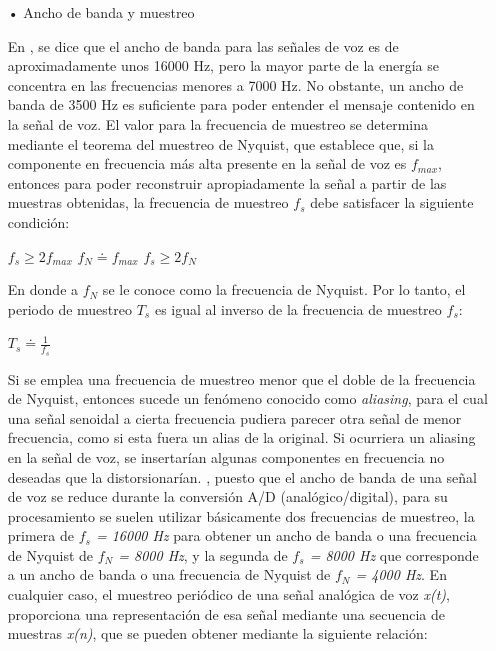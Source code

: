 \begin{enumerate}
\begin{enumerate}
\item[•]Ancho de banda y muestreo
\par
En \cite{claudio}, se dice que el ancho de banda para las señales de voz es de aproximadamente unos 16000 Hz, pero la mayor parte de la energía se concentra en las frecuencias menores a 7000 Hz. No obstante, un ancho de banda de 3500 Hz es suficiente para poder entender el mensaje contenido en la señal de voz.
\vskip 0.5cm
El valor para la frecuencia de muestreo se determina mediante el teorema del muestreo de Nyquist, que establece que, si la componente en frecuencia más alta presente en la señal de voz es \textit{$f_{max}$}, entonces para poder reconstruir apropiadamente la señal a partir de las muestras obtenidas, la frecuencia de muestreo \textit{$f_{s}$} debe satisfacer la siguiente condición:
\begin{center}
$f_{s} \geq 2f_{max}$ \hspace{1cm} $f_{N} \doteq f_{max}$ \hspace{1cm} $f_{s} \geq 2f_{N}$
\end{center}
En donde a $f_{N}$ se le conoce como la frecuencia de Nyquist. Por lo tanto, el periodo de muestreo $T_{s}$ es igual al inverso de la frecuencia de muestreo \textit{$f_{s}$}:
\begin{center}
$T_{s} \doteq \frac{1}{f_{s}}$
\end{center}
Si se emplea una frecuencia de muestreo menor que el doble de la frecuencia de Nyquist, entonces sucede un fenómeno conocido como \textit{aliasing}, para el cual una señal senoidal a cierta frecuencia pudiera parecer otra señal de menor frecuencia, como si esta fuera un alias de la original. Si ocurriera un aliasing en la señal de voz, se insertarían algunas componentes en frecuencia no deseadas que la distorsionarían.
\newpage
\cite{claudio}, puesto que el ancho de banda de una señal de voz se reduce durante la conversión A/D (analógico/digital), para su procesamiento se suelen utilizar básicamente dos frecuencias de muestreo, la primera de \textit{$f_{s}$ = 16000 Hz} para obtener un ancho de banda o una frecuencia de Nyquist de \textit{$f_{N}$ = 8000 Hz}, y la segunda de \textit{$f_{s}$ = 8000 Hz} que corresponde a un ancho de banda o una frecuencia de Nyquist de \textit{$f_{N}$ = 4000 Hz}.
\vskip 0.5cm
En cualquier caso, el muestreo periódico de una señal analógica de voz \textit{x(t)}, proporciona una representación de esa señal mediante una secuencia de muestras \textit{x(n)}, que se pueden obtener mediante la siguiente relación:
\begin{center}

\end{center}
\end{enumerate}
\end{enumerate}
